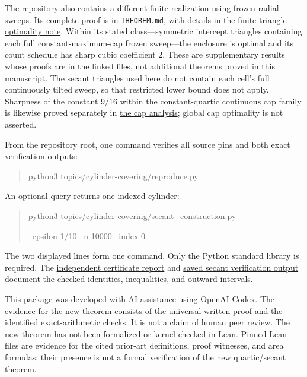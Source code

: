 \documentclass[11pt]{amsart}
\theoremstyle{definition}
\theoremstyle{remark}
\newcommand{\repo}[2]{\href{https://github.com/shjvandekamp/math/blob/main/topics/cylinder-covering/#1}{#2}}
\begin{document}
The repository also contains a different finite realization using frozen
radial sweeps. Its complete proof is in
\repo{THEOREM.md}{\texttt{THEOREM.md}}, with details in the
\repo{research/finite-triangle-optimality.md}{finite-triangle optimality
note}. Within its stated class---symmetric intercept triangles containing
each full constant-maximum-cap frozen sweep---the enclosure is optimal
and its count schedule has sharp cubic coefficient 2. These are
supplementary results whose proofs are in the linked files, not additional
theorems proved in this manuscript. The secant triangles used here do not
contain each cell's full continuously tilted sweep, so that restricted
lower bound does not apply. Sharpness of the constant $9/16$ within the
constant-quartic continuous cap family is likewise proved separately in
\repo{research/cap-analysis.md}{the cap analysis}; global cap optimality
is not asserted.

From the repository root, one command verifies all source pins and both
exact verification outputs:
\begin{quote}\small\ttfamily
python3 topics/cylinder-covering/reproduce.py
\end{quote}
An optional query returns one indexed cylinder:
\begin{quote}\small\ttfamily
python3 topics/cylinder-covering/secant\_construction.py\par
\hspace*{1em}--epsilon 1/10 --n 10000 --index 0
\end{quote}
The two displayed lines form one command. Only the Python standard
library is required. The
\repo{verification/secant-report.md}{independent certificate report} and
\repo{verification/secant-last-run.txt}{saved secant verification output}
document the checked identities, inequalities, and outward intervals.

This package was developed with AI assistance using OpenAI Codex.
The evidence for the new theorem consists of the universal written proof
and the identified exact-arithmetic checks. It is not a claim of human
peer review. The new theorem has not been formalized or kernel checked
in Lean. Pinned Lean files are evidence for the cited prior-art definitions,
proof witnesses, and area formulas; their presence is not a formal
verification of the new quartic/secant theorem.
\end{document}
